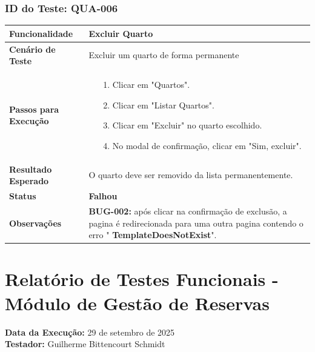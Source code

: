 \documentclass[
	12pt,				%
	openany,			%
	oneside,			%
	a4paper,			%
	english,			%
	french,				%
	spanish,			%
	brazil				%
	]{abntex2}
\begin{document}
\begin{apendicesenv}
\subsection*{ID do Teste: QUA-006}
\begin{tabular}{@{} p{5cm} p{11cm} @{}}
	\toprule
	\textbf{Funcionalidade} & Excluir Quarto \\
	\midrule
	\textbf{Cenário de Teste} & Excluir um quarto de forma permanente \\
	\midrule
	\textbf{Passos para Execução} &
	\begin{itemize} \itemsep0em 
		\item[1.] Clicar em "Quartos".
		\item[2.] Clicar em "Listar Quartos".
		\item[3.] Clicar em "Excluir" no quarto escolhido.
		\item[4.] No modal de confirmação, clicar em "Sim, excluir".
	\end{itemize} \\
	\midrule
	\textbf{Resultado Esperado} & O quarto deve ser removido da lista permanentemente. \\
	\midrule
	\textbf{Status} & \textbf{Falhou} \\
	\midrule
	\textbf{Observações} & \textbf{BUG-002:} após clicar na confirmação de exclusão, a pagina é redirecionada para uma outra pagina contendo o erro " \textbf{TemplateDoesNotExist}". \\
\end{tabular}



\chapter{Relatório de Testes Funcionais - Módulo de Gestão de Reservas}

\textbf{Data da Execução:} 29 de setembro de 2025 \\
\textbf{Testador:} Guilherme Bittencourt Schmidt \\

\vspace{1cm}



\end{apendicesenv}
\end{document}
